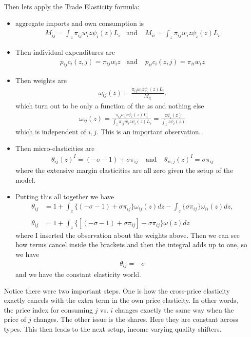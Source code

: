 \documentclass[pdftex,11pt]{article}
\begin{document}
Then lets apply the Trade Elasticity formula:
\begin{itemize}
\item aggregate imports and own consumption is
\begin{align}
M_{ij} = \int_{z} \pi_{ij} w_i z \psi_{i}(z) L_i \ \ \ \ \mbox{and} \ \ \ \ \ M_{ii} = \int_{z} \pi_{ij} w_i z \psi_{i}(z) L_i
\end{align}

\item Then individual expenditures are 
\begin{align}
p_{ij}c_{i}(z,j) = \pi_{ij} w_i z \ \ \ \ \mbox{and} \ \ \ \ \ p_{ii}c_{i}(z,j) = \pi_{ii} w_i z
\end{align}
 
\item Then weights are
\begin{align}
\omega_{ij}(z)  = \frac{\pi_{ij} w_i z \psi_{i}(z) L_i}{M_{ij}}.
\end{align}
which turn out to be only a function of the $z$s and nothing else
\begin{align}
\omega_{ij}(z)  = \frac{\pi_{ij} w_i z \psi_{i}(z) L_i}{\int_{z} \pi_{ij} w_i z \psi_{i}(z) L_i} = \frac{z \psi_{i}(z)}{\int_{z}z \psi_{i}(z)}
\end{align}
which is independent of $i,j$. This is an important observation. 
 
\item Then micro-elasticities are
\begin{align}
\theta_{ij}(z)^{I} = (-\sigma -1 ) + \sigma \pi_{ij} \ \ \ \ \ \mbox{and} \ \ \ \ \ \theta_{ii,j}(z)^{I} =  \sigma \pi_{ij} 
\end{align}
where the extensive margin elasticities are all zero given the setup of the model.

\item Putting this all together we have
\begin{align}
\nonumber 
\theta_{ij} &= 1 + \int_{z} \bigg \{ (-\sigma -1 ) + \sigma \pi_{ij}  \bigg \}\omega_{ij}(z) dz - \int_{z} \bigg \{ \sigma \pi_{ij} \bigg \}\omega_{ii}(z) dz, \\
\nonumber \\
\theta_{ij} &= 1 + \int_{z} \bigg \{ [ (-\sigma -1 ) + \sigma \pi_{ij} ]  - \sigma \pi_{ij}  \bigg \}\omega(z) dz
\end{align}
where I inserted the observation about the weights above. Then we can see how terms cancel inside the brackets and then the integral adds up to one, so we have
\begin{align} 
\theta_{ij} = -\sigma
\end{align}
and we have the constant elasticity world.
\end{itemize}
Notice there were two important steps. One is how the cross-price elasticity exactly cancels with the extra term in the own price elasticity. In other words, the price index for consuming $j$ vs. $i$ changes exactly the same way when the price of $j$ changes. The other issue is the shares. Here they are constant across types. This then leads to the next setup, income varying quality shifters.
\end{document}
